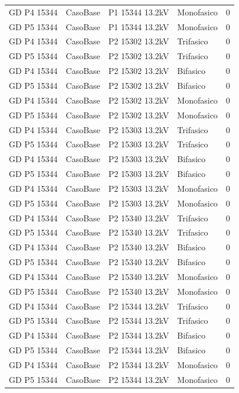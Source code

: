 \documentclass[11pt,a4paper]{article}
\begin{document}
\begin{longtable}{llllr}
GD P4 15344 & CasoBase & P1 15344 13.2kV & Monofasico & 0 \\
GD P5 15344 & CasoBase & P1 15344 13.2kV & Monofasico & 0 \\
GD P4 15344 & CasoBase & P2 15302 13.2kV & Trifasico & 0 \\
GD P5 15344 & CasoBase & P2 15302 13.2kV & Trifasico & 0 \\
GD P4 15344 & CasoBase & P2 15302 13.2kV & Bifasico & 0 \\
GD P5 15344 & CasoBase & P2 15302 13.2kV & Bifasico & 0 \\
GD P4 15344 & CasoBase & P2 15302 13.2kV & Monofasico & 0 \\
GD P5 15344 & CasoBase & P2 15302 13.2kV & Monofasico & 0 \\
GD P4 15344 & CasoBase & P2 15303 13.2kV & Trifasico & 0 \\
GD P5 15344 & CasoBase & P2 15303 13.2kV & Trifasico & 0 \\
GD P4 15344 & CasoBase & P2 15303 13.2kV & Bifasico & 0 \\
GD P5 15344 & CasoBase & P2 15303 13.2kV & Bifasico & 0 \\
GD P4 15344 & CasoBase & P2 15303 13.2kV & Monofasico & 0 \\
GD P5 15344 & CasoBase & P2 15303 13.2kV & Monofasico & 0 \\
GD P4 15344 & CasoBase & P2 15340 13.2kV & Trifasico & 0 \\
GD P5 15344 & CasoBase & P2 15340 13.2kV & Trifasico & 0 \\
GD P4 15344 & CasoBase & P2 15340 13.2kV & Bifasico & 0 \\
GD P5 15344 & CasoBase & P2 15340 13.2kV & Bifasico & 0 \\
GD P4 15344 & CasoBase & P2 15340 13.2kV & Monofasico & 0 \\
GD P5 15344 & CasoBase & P2 15340 13.2kV & Monofasico & 0 \\
GD P4 15344 & CasoBase & P2 15344 13.2kV & Trifasico & 0 \\
GD P5 15344 & CasoBase & P2 15344 13.2kV & Trifasico & 0 \\
GD P4 15344 & CasoBase & P2 15344 13.2kV & Bifasico & 0 \\
GD P5 15344 & CasoBase & P2 15344 13.2kV & Bifasico & 0 \\
GD P4 15344 & CasoBase & P2 15344 13.2kV & Monofasico & 0 \\
GD P5 15344 & CasoBase & P2 15344 13.2kV & Monofasico & 0 \\

\end{longtable}
\end{document}
